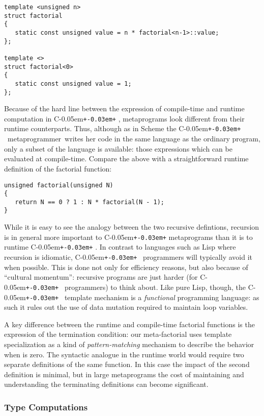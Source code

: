 \documentclass{netobjectdays}
\newcommand{\Cpp}{C\kern-0.05em\texttt{+\kern-0.03em+}%
}
\newcommand{\mpgmer}{meta\-program\-mer}
\begin{document}
{\footnotesize
\begin{verbatim}
template <unsigned n>
struct factorial
{
   static const unsigned value = n * factorial<n-1>::value;
};

template <>
struct factorial<0>
{
   static const unsigned value = 1;
};
\end{verbatim}
}

Because of the hard line between the expression of compile-time and
runtime computation in \Cpp, metaprograms look different from their
runtime counterparts. Thus, although as in Scheme the \Cpp\ \mpgmer\
writes her code in the same language as the ordinary program, only a
subset of the language is available: those expressions which
can be evaluated at compile-time. Compare the above with a
straightforward runtime definition of the factorial function:

{\footnotesize
\begin{verbatim}
unsigned factorial(unsigned N)
{
   return N == 0 ? 1 : N * factorial(N - 1);
}
\end{verbatim}
}

While it is easy to see the analogy between the two recursive
defintions, recursion is in general more important to \Cpp{}
metaprograms than it is to runtime \Cpp. In contrast to languages such
as Lisp where recursion is idiomatic, \Cpp\ programmers will typically
avoid it when possible. This is done not only for efficiency
reasons, but also because of ``cultural momentum'': recursive programs
are just harder (for \Cpp\ programmers) to think about. Like pure Lisp,
though, the \Cpp\ template mechanism is a \emph{functional} programming
language: as such it rules out the use of data mutation required to
maintain loop variables.

A key difference between the runtime and compile-time factorial
functions is the expression of the termination condition: our
meta-factorial uses template specialization as a kind of
\emph{pattern-matching} mechanism to describe the behavior when
 is zero. The syntactic analogue in the runtime world would
require two separate definitions of the same function. In this case
the impact of the second definition is minimal, but in large
metaprograms the cost of maintaining and understanding the terminating
definitions can become significant.

\subsubsection{Type Computations}
\end{document}
